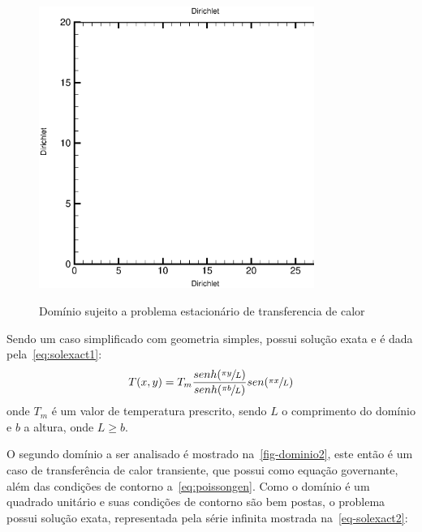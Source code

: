 \documentclass[
	12pt,				  %
	openright,		%
	twoside,			%
	a4paper,			%
	chapter=TITLE,		    %
	english,			%
	brazil				%
	]{abntex2}
\begin{document}
\begin{figure}[!htb]
\centering
\caption[Domínio sujeito a problema estacionário de transferencia de calor]
    {Domínio sujeito a problema estacionário de transferencia de calor}
\includegraphics[width=0.8\textwidth]{figures/export.eps}
\label{fig:dominio1}
\end{figure}

Sendo um caso simplificado com geometria simples, possui solução exata e é dada
pela~\autoref{eq:solexact1}:
\begin{equation}
    T(x,y) = T_m \frac{senh(\sfrac{\pi y}{L})}{senh(\sfrac{\pi
    b}{L})}sen(\sfrac{\pi x}{L})
    \label{eq:solexact1}
\end{equation}
onde $T_m$ é um valor de temperatura prescrito, sendo $L$ o comprimento do
domínio e $b$ a altura, onde $L \ge b$. 

O segundo domínio a ser analisado é mostrado na~\autoref{fig-dominio2}, este
então é um caso de transferência de calor transiente, que possui como equação
governante, além das condições de contorno a~\autoref{eq:poissongen}. Como o
domínio é um quadrado unitário e suas condições de contorno são bem postas, o
problema possui solução exata, representada pela série infinita mostrada
na~\autoref{eq-solexact2}:
\end{document}
